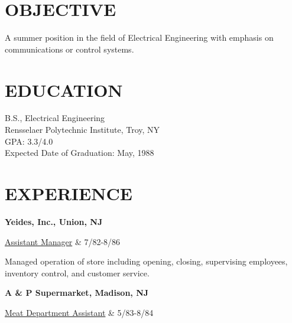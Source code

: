 \documentclass[margin,11pt]{res} %
\begin{document}

\address{{\bf Local Address} \\  19 Tibbits Avenue  \\ Troy, NY 12180\\
        (518) 274-3087}
\address{ {\bf Permanent Address} \\ 29 Amorous Avenue \\ Madison, NJ 07940 \\
         (201) 777-3821 }

\begin{resume}
 
\section{OBJECTIVE}  
     A summer position in the field of Electrical 
                Engineering with emphasis on communications or 
                control systems. 
 
\section{EDUCATION}       B.S., Electrical Engineering  \\
                Rensselaer Polytechnic Institute, Troy, NY \\ 
                GPA: 3.3/4.0 \\
                Expected Date of Graduation: May, 1988 
 
 
\section{EXPERIENCE}      {\bf Yeides, Inc., Union, NJ} \\
                \begin{ncolumn}{2} %
                \underline{Assistant Manager}     &      7/82-8/86 
                \end{ncolumn}

                Managed operation of store including opening, 
                closing, supervising employees, inventory 
                control, and customer service. 
 
                {\bf A \& P Supermarket, Madison, NJ} \\ 
                \begin{ncolumn}{2} %
                \underline{Meat Department Assistant} &   5/83-8/84 
                \end{ncolumn}


\end{resume}
\end{document}
